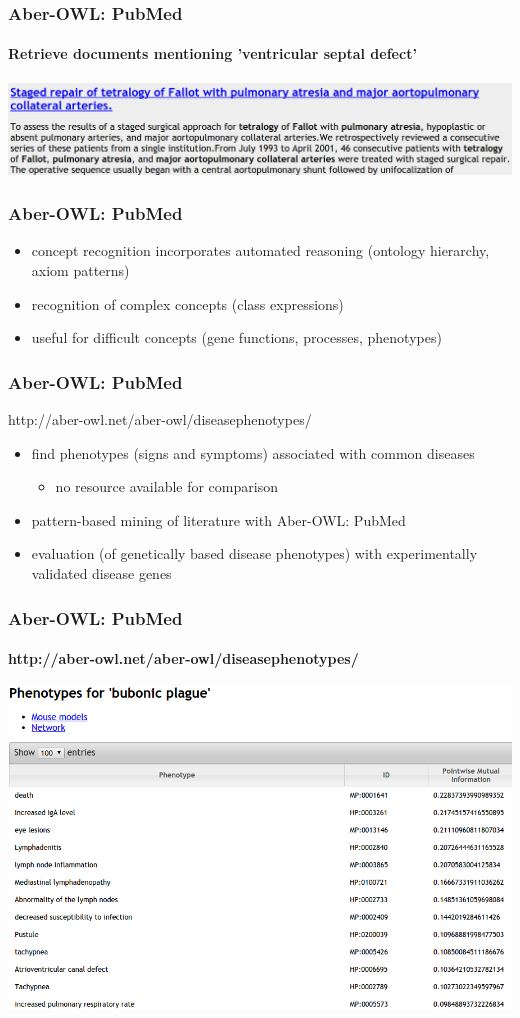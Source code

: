 \documentclass{beamer}
\begin{document}
\begin{frame}
  \frametitle{Aber-OWL: PubMed}
  \framesubtitle{Retrieve documents mentioning 'ventricular septal defect'}
  \centerline{\includegraphics[width=1\textwidth]{aber-pubmed-search.png}}
\end{frame}

\begin{frame}
  \frametitle{Aber-OWL: PubMed}
  \begin{itemize}
  \item concept recognition incorporates automated reasoning (ontology
    hierarchy, axiom patterns)
  \item recognition of complex concepts (class expressions)
  \item useful for difficult concepts (gene functions, processes,
    phenotypes)
  \end{itemize}
\end{frame}

\begin{frame}
  \frametitle{Aber-OWL: PubMed}
  \centerline{http://aber-owl.net/aber-owl/diseasephenotypes/}
  \begin{itemize}
  \item find phenotypes (signs and symptoms) associated with common
    diseases
    \begin{itemize}
    \item no resource available for comparison
    \end{itemize}
  \item pattern-based mining of literature with Aber-OWL: PubMed
  \item evaluation (of genetically based disease phenotypes) with
    experimentally validated disease genes
  \end{itemize}
\end{frame}

\begin{frame}
  \frametitle{Aber-OWL: PubMed}
  \framesubtitle{http://aber-owl.net/aber-owl/diseasephenotypes/}
  \centerline{\includegraphics[width=1\textwidth]{aber-owl-plague.png}}
\end{frame}
\end{document}
